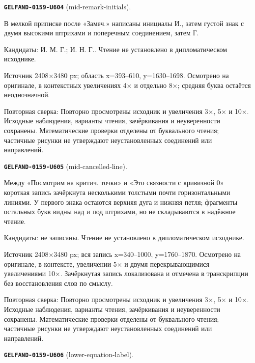 \par\noindent\leavevmode{}\label{GELFAND-0159-U604}\label{GELFAND-P001474:mid-remark-initials}\textbf{\texttt{GELFAND-0159-U604}} (mid-remark-initials).\nopagebreak[4]\par
В мелкой приписке после «Замеч.» написаны инициалы И., затем густой знак с двумя высокими штрихами и поперечным соединением, затем Г.\par
Кандидаты: И. М. Г.; И. Н. Г.. Чтение не установлено в дипломатическом исходнике.\par
Источник 2408×3480 px; область x=393–610, y=1630–1698. Осмотрено на оригинале, в контекстных увеличениях 4× и отдельно 8×; средняя буква остаётся неоднозначной.\par
Повторная сверка: Повторно просмотрены исходник и увеличения 3×, 5× и 10×. Исходные наблюдения, варианты чтения, зачёркивания и неуверенности сохранены. Математические проверки отделены от буквального чтения; частичные рисунки не утверждают неустановленных соединений или направлений.\par\medskip
\par\noindent\leavevmode{}\label{GELFAND-0159-U605}\label{GELFAND-P001474:mid-cancelled-line}\textbf{\texttt{GELFAND-0159-U605}} (mid-cancelled-line).\nopagebreak[4]\par
Между «Посмотрим на критич. точки» и «Это связности с кривизной 0» короткая запись зачёркнута несколькими толстыми почти горизонтальными линиями. У первого знака остаются верхняя дуга и нижняя петля; фрагменты остальных букв видны над и под штрихами, но не складываются в надёжное чтение.\par
Кандидаты: не записаны. Чтение не установлено в дипломатическом исходнике.\par
Источник 2408×3480 px; вся запись x=340–1000, y=1760–1870. Осмотрено на оригинале, в контексте, увеличении 5× и двумя перекрывающимися увеличениями 10×. Зачёркнутая запись локализована и отмечена в транскрипции без восстановления слов по смыслу.\par
Повторная сверка: Повторно просмотрены исходник и увеличения 3×, 5× и 10×. Исходные наблюдения, варианты чтения, зачёркивания и неуверенности сохранены. Математические проверки отделены от буквального чтения; частичные рисунки не утверждают неустановленных соединений или направлений.\par\medskip
\par\noindent\leavevmode{}\label{GELFAND-0159-U606}\label{GELFAND-P001474:lower-equation-label}\textbf{\texttt{GELFAND-0159-U606}} (lower-equation-label).\nopagebreak[4]\par
